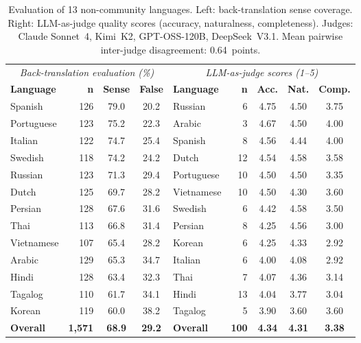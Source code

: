 \documentclass[11pt,a4paper]{article}
\begin{document}
\begin{table}[t]
\centering
\footnotesize
\begin{tabular}{lrcc@{\hskip 3em}lrccc}
\toprule
\multicolumn{4}{c}{\textit{Back-translation evaluation (\%)}} & \multicolumn{5}{c}{\textit{LLM-as-judge scores (1--5)}} \\
\cmidrule(r){1-4} \cmidrule(l){5-9}
\textbf{Language} & \textbf{n} & \textbf{Sense} & \textbf{False} &
\textbf{Language} & \textbf{n} & \textbf{Acc.} & \textbf{Nat.} & \textbf{Comp.} \\
\midrule
Spanish    & 126 & 79.0 & 20.2 & Russian    &  6 & 4.75 & 4.50 & 3.75 \\
Portuguese & 123 & 75.2 & 22.3 & Arabic     &  3 & 4.67 & 4.50 & 4.00 \\
Italian    & 122 & 74.7 & 25.4 & Spanish    &  8 & 4.56 & 4.44 & 4.00 \\
Swedish    & 118 & 74.2 & 24.2 & Dutch      & 12 & 4.54 & 4.58 & 3.58 \\
Russian    & 123 & 71.3 & 29.4 & Portuguese & 10 & 4.50 & 4.50 & 3.35 \\
Dutch      & 125 & 69.7 & 28.2 & Vietnamese & 10 & 4.50 & 4.30 & 3.60 \\
Persian    & 128 & 67.6 & 31.6 & Swedish    &  6 & 4.42 & 4.58 & 3.50 \\
Thai       & 113 & 66.8 & 31.4 & Persian    &  8 & 4.25 & 4.56 & 3.00 \\
Vietnamese & 107 & 65.4 & 28.2 & Korean     &  6 & 4.25 & 4.33 & 2.92 \\
Arabic     & 129 & 65.3 & 34.7 & Italian    &  6 & 4.00 & 4.08 & 2.92 \\
Hindi      & 128 & 63.4 & 32.3 & Thai       &  7 & 4.07 & 4.36 & 3.14 \\
Tagalog    & 110 & 61.7 & 34.1 & Hindi      & 13 & 4.04 & 3.77 & 3.04 \\
Korean     & 119 & 60.0 & 38.2 & Tagalog    &  5 & 3.90 & 3.60 & 3.60 \\
\midrule
\textbf{Overall} & \textbf{1{,}571} & \textbf{68.9} & \textbf{29.2} &
\textbf{Overall} & \textbf{100} & \textbf{4.34} & \textbf{4.31} & \textbf{3.38} \\
\bottomrule
\end{tabular}
\caption{Evaluation of 13 non-community languages. Left: back-translation sense coverage. Right: LLM-as-judge quality scores (accuracy, naturalness, completeness). Judges: Claude Sonnet~4, Kimi~K2, GPT-OSS-120B, DeepSeek~V3.1. Mean pairwise inter-judge disagreement: 0.64~points.}
\label{tab:backtrans-judge}
\end{table}
\end{document}
